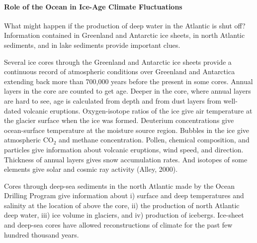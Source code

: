 \paragraph{Role of the Ocean in Ice-Age Climate Fluctuations}
What might happen if the production of deep water in the Atlantic is shut off? Information contained in Greenland and Antarctic ice sheets, in north Atlantic sediments, and in lake sediments provide important clues.

Several ice cores through the Greenland and Antarctic ice sheets provide a continuous record of atmospheric conditions over Greenland and Antarctica extending back more than 700,000 years before the present in some cores. Annual layers in the core are counted to get age. Deeper in the core, where annual layers are hard to see, age is calculated from depth and from dust layers from well-dated volcanic eruptions. Oxygen-isotope ratios of the ice give air temperature at the glacier surface when the ice was formed. Deuterium concentrations give ocean-surface temperature at the moisture source region. Bubbles in the ice give atmospheric CO$_2$ and methane concentration. Pollen, chemical composition, and particles give information about volcanic eruptions, wind speed, and direction. Thickness of annual layers gives snow accumulation rates. And isotopes of some elements give solar and cosmic ray activity (Alley, 2000).

Cores through deep-sea sediments in the north Atlantic made by the Ocean Drilling Program give information about i) surface and deep temperatures and salinity at the location of above the core, ii) the production of north Atlantic deep water, iii) ice volume in glaciers, and iv) production of icebergs. Ice-sheet and deep-sea cores have allowed reconstructions of climate for the past few hundred thousand years.

